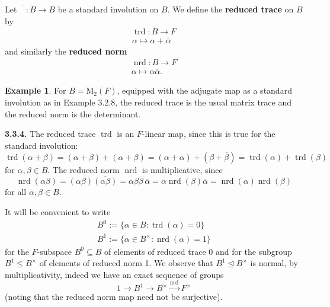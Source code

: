 \documentclass{article}
\theoremstyle{definition}
\newtheorem{example}[theorem]{Example}
\begin{document}
Let $\overline{\phantom{B}} : B \to B$ be a standard involution on $B$. We define the \textbf{reduced trace} on $B$ by
\begin{equation}
\begin{array}{c} \operatorname{trd}: B \to F \\ \alpha \mapsto \alpha + \overline{\alpha} \end{array} \tag{3.3.1}
\end{equation}
and similarly the \textbf{reduced norm}
\begin{equation}
\begin{array}{c} \operatorname{nrd}: B \to F \\ \alpha \mapsto \alpha \overline{\alpha}. \end{array} \tag{3.3.2}
\end{equation}

\begin{example}
For $B = \mathrm{M}_2(F)$, equipped with the adjugate map as a standard involution as in Example 3.2.8, the reduced trace is the usual matrix trace and the reduced norm is the determinant.
\end{example}

\textbf{3.3.4.} The reduced trace $\operatorname{trd}$ is an $F$-linear map, since this is true for the standard involution:
$$\operatorname{trd}(\alpha + \beta) = (\alpha + \beta) + \overline{(\alpha + \beta)} = (\alpha + \overline{\alpha}) + (\beta + \overline{\beta}) = \operatorname{trd}(\alpha) + \operatorname{trd}(\beta)$$
for $\alpha, \beta \in B$. The reduced norm $\operatorname{nrd}$ is multiplicative, since
$$\operatorname{nrd}(\alpha\beta) = (\alpha\beta)\overline{(\alpha\beta)} = \alpha\beta\overline{\beta}\,\overline{\alpha} = \alpha\operatorname{nrd}(\beta)\overline{\alpha} = \operatorname{nrd}(\alpha)\operatorname{nrd}(\beta)$$
for all $\alpha, \beta \in B$.

It will be convenient to write
\begin{equation}
\begin{array}{l} B^0 := \{\alpha \in B : \operatorname{trd}(\alpha) = 0\} \\ B^1 := \{\alpha \in B^\times : \operatorname{nrd}(\alpha) = 1\} \end{array} \tag{3.3.5}
\end{equation}
for the $F$-subspace $B^0 \subseteq B$ of elements of reduced trace 0 and for the subgroup $B^1 \leq B^\times$ of elements of reduced norm 1. We observe that $B^1 \trianglelefteq B^\times$ is normal, by multiplicativity, indeed we have an exact sequence of groups
$$1 \to B^1 \to B^\times \xrightarrow{\operatorname{nrd}} F^\times$$
(noting that the reduced norm map need not be surjective).
\end{document}
